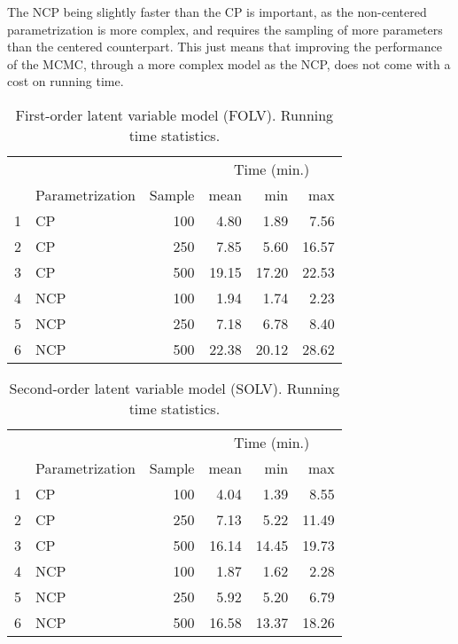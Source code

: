 The NCP being slightly faster than the CP is important, as the non-centered parametrization is more complex, and requires the sampling of more parameters than the centered counterpart. This just means that improving the performance of the MCMC, through a more complex model as the NCP, does not come with a cost on running time.
%
\begin{table}[H]
	\centering
	\begin{tabular}{rlrrrr}
		\hline
		\multicolumn{3}{c}{ }& \multicolumn{3}{c}{ Time (min.) } \\ 
		\cmidrule(rl){4-6} 
		& Parametrization & Sample & mean & min & max \\ 
		\hline\hline
		1 & CP & 100 & 4.80 & 1.89 & 7.56 \\ 
		2 & CP & 250 & 7.85 & 5.60 & 16.57 \\ 
		3 & CP & 500 & 19.15 & 17.20 & 22.53 \\ 
		\hline
		4 & NCP & 100 & 1.94 & 1.74 & 2.23 \\ 
		5 & NCP & 250 & 7.18 & 6.78 & 8.40 \\ 
		6 & NCP & 500 & 22.38 & 20.12 & 28.62 \\
		\hline
	\end{tabular}
	\caption[First-order latent variable model (FOLV). Running time statistics.]%
	{First-order latent variable model (FOLV). Running time statistics.} 
	\label{tab:FOLV_time}
\end{table}
%
\begin{table}[H]
	\centering
	\begin{tabular}{rlrrrr}
		\hline
		\multicolumn{3}{c}{ }& \multicolumn{3}{c}{ Time (min.) } \\ 
		\cmidrule(rl){4-6} 
		& Parametrization & Sample & mean & min & max \\ 
		\hline\hline
		1 & CP & 100 & 4.04 & 1.39 & 8.55 \\ 
		2 & CP & 250 & 7.13 & 5.22 & 11.49 \\ 
		3 & CP & 500 & 16.14 & 14.45 & 19.73 \\ 
		\hline
		4 & NCP & 100 & 1.87 & 1.62 & 2.28 \\ 
		5 & NCP & 250 & 5.92 & 5.20 & 6.79 \\ 
		6 & NCP & 500 & 16.58 & 13.37 & 18.26 \\
		\hline
	\end{tabular}
	\caption[Second-order latent variable model (SOLV). Running time statistics.]%
	{Second-order latent variable model (SOLV). Running time statistics.} 
	\label{tab:SOLV_time}
\end{table}
